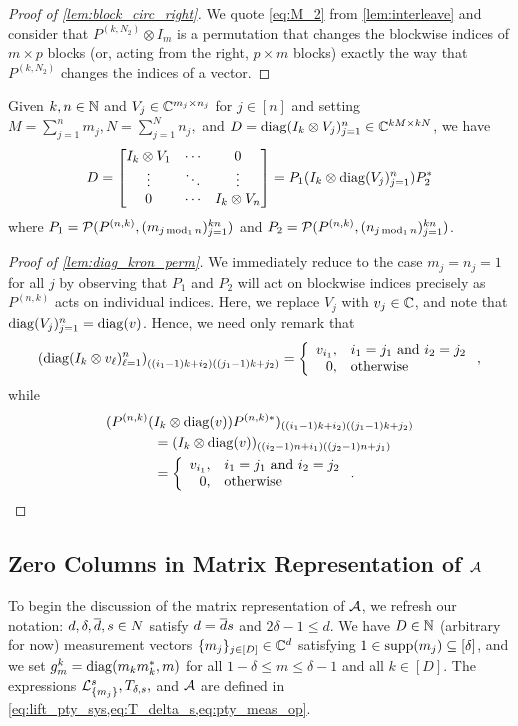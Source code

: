 \begin{proof}[Proof of \cref{lem:block_circ_right}]
  We quote \eqref{eq:M_2} from \cref{lem:interleave} and consider that $P^{(k, N_2)} \otimes I_m$ is a permutation that changes the blockwise indices of $m \times p$ blocks (or, acting from the right, $p \times m$ blocks) exactly the way that $P^{(k, N_2)}$ changes the indices of a vector.
\end{proof}

\begin{lemma} \label{lem:diag_kron_perm}
  Given $k, n \in \mathbb{N}$ and $V_j \in \mathbb{C}^{m_j \times n_j}$ for $j \in [n]$ and setting $M = \sum_{j = 1}^n m_j, N = \sum_{j = 1}^N n_j,$ and $D = \operatorname{diag}(I_k \otimes V_j)_{j = 1}^n \in \mathbb{C}^{k M \times k N}$, we have \[D =  \begin{bmatrix} I_k \otimes V_1 & \cdots & 0 \\ \vdots & \ddots & \vdots \\ 0 & \cdots & I_k \otimes V_n \end{bmatrix}  = P_1 (I_k \otimes \operatorname{diag}(V_j)_{j = 1}^n) P_2^*\] where $P_1 = \mathcal{P}(P^{(n, k)}, (m_{j \operatorname{\mathbin{mod}}_1 n})_{j = 1}^{kn})$ and $P_2 = \mathcal{P}(P^{(n, k)}, (n_{j \operatorname{\mathbin{mod}}_1 n})_{j = 1}^{kn})$.
\end{lemma}

\begin{proof}[Proof of \cref{lem:diag_kron_perm}]
  We immediately reduce to the case $m_j = n_j = 1$ for all $j$ by observing that $P_1$ and $P_2$ will act on blockwise indices precisely as $P^{(n, k)}$ acts on individual indices.  Here, we replace $V_j$ with $v_j \in \mathbb{C}$, and note that $\operatorname{diag}(V_j)_{j = 1}^n = \operatorname{diag}(v)$.  Hence, we need only remark that \[\left(\diag(I_k \otimes v_\ell)_{\ell = 1}^n\right)_{((i_1 - 1)k + i_2) ((j_1 - 1)k + j_2)} = \left\{\begin{array}{r@{,\quad}l} v_{i_1} & i_1 = j_1 \ \text{and} \ i_2 = j_2 \\ 0 & \text{otherwise} \end{array}\right.,\] while \begin{align*} (P^{(n, k)} (&I_k \otimes \diag(v)) P^{(n, k)*})_{((i_1 - 1)k + i_2) ((j_1 - 1)k + j_2)} \\ &= (I_k \otimes \diag(v))_{((i_2 - 1)n + i_1) ((j_2 - 1)n + j_1)} \\ &= \left\{\begin{array}{r@{,\quad}l} v_{i_1} & i_1 = j_1 \ \text{and} \ i_2 = j_2 \\ 0 & \text{otherwise} \end{array}\right..\end{align*}
\end{proof}

\subsection{Zero Columns in Matrix Representation of $\mathcal{A}$}
\label{sec:pty_zero_col}
To begin the discussion of the matrix representation of $\mathcal{A}$, we refresh our notation: $d, \delta, \overline{d}, s \in N$ satisfy $d = \overline{d} s$ and $2 \delta - 1 \le d$.  We have $D \in \mathbb{N}$ (arbitrary for now) measurement vectors $\{m_j\}_{j \in [D]} \in \mathbb{C}^d$ satisfying $1 \in \operatorname{supp}(m_j) \subseteq [\delta]$, and we set $g_m^k = \operatorname{diag}(m_k m_k^*, m)$ for all $1 - \delta \le m \le \delta - 1$ and all $k \in [D]$.  The expressions $\mathcal{L}_{\{m_j\}}^s, T_{\delta, s},$ and $\mathcal{A}$ are defined in \cref{eq:lift_pty_sys,eq:T_delta_s,eq:pty_meas_op}.

